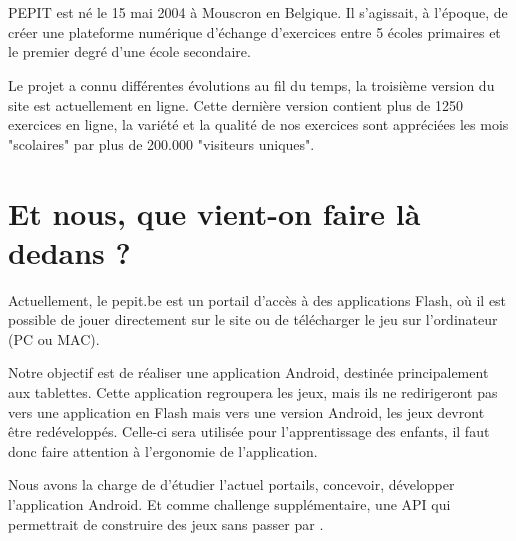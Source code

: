 \section{\pepit}
PEPIT est né le 15 mai 2004 à Mouscron en Belgique. Il s'agissait, à l'époque, de créer une plateforme numérique d'échange d'exercices entre 5 écoles primaires et le premier degré d'une école secondaire.


Le projet a connu différentes évolutions au fil du temps, la troisième version du site est actuellement en ligne. Cette dernière version contient plus de 1250 exercices en ligne, la variété et la qualité de nos exercices sont appréciées les mois "scolaires" par plus de 200.000 "visiteurs uniques".
\section{Et nous, que vient-on faire là dedans ?}
Actuellement, le pepit.be est un portail d'accès à des applications Flash, où il est possible de jouer directement sur le site ou de télécharger le jeu sur l'ordinateur (PC ou MAC).


Notre objectif est de réaliser une application Android, destinée principalement aux tablettes. Cette application regroupera les jeux, mais ils ne redirigeront pas vers une application en Flash mais vers une version Android, les jeux devront être redéveloppés. Celle-ci sera utilisée pour l'apprentissage des enfants, il faut donc faire attention à l'ergonomie de l'application.


Nous avons la charge de d'étudier l'actuel portails, concevoir, développer l'application Android. Et comme challenge supplémentaire, une API qui permettrait de construire des jeux sans passer par \java{}.